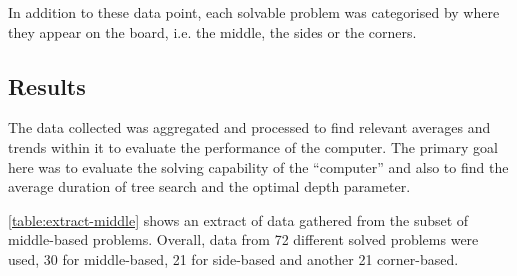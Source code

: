 \documentclass{l4proj}
\begin{document}
In addition to these data point, each solvable problem was categorised by where they appear on the board, i.e. the middle, the sides or the corners.

\subsection{Results}
The data collected was aggregated and processed to find relevant averages and trends within it to evaluate the performance of the computer. The primary goal here was to evaluate the solving capability of the “computer” and also to find the average duration of tree search and the optimal depth parameter.

\autoref{table:extract-middle} shows an extract of data gathered from the subset of middle-based problems. Overall, data from 72 different solved problems were used, 30 for middle-based, 21 for side-based and another 21 corner-based.
\end{document}
